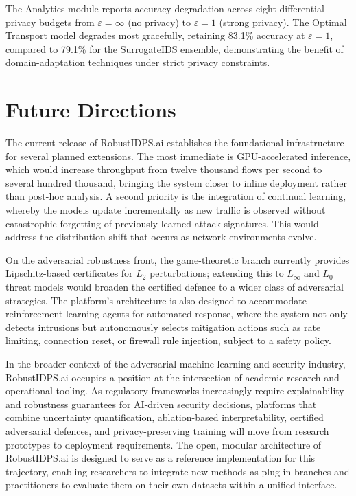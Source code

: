\documentclass[11pt,a4paper]{article}
\begin{document}
The Analytics module reports accuracy degradation across eight differential
privacy budgets from $\varepsilon = \infty$ (no privacy) to $\varepsilon = 1$
(strong privacy). The Optimal Transport model degrades most gracefully,
retaining 83.1\% accuracy at $\varepsilon = 1$, compared to 79.1\% for the
SurrogateIDS ensemble, demonstrating the benefit of domain-adaptation
techniques under strict privacy constraints.

\section{Future Directions}

The current release of RobustIDPS.ai establishes the foundational
infrastructure for several planned extensions. The most immediate is
GPU-accelerated inference, which would increase throughput from twelve
thousand flows per second to several hundred thousand, bringing the
system closer to inline deployment rather than post-hoc analysis. A
second priority is the integration of continual learning, whereby the
models update incrementally as new traffic is observed without
catastrophic forgetting of previously learned attack signatures. This
would address the distribution shift that occurs as network environments
evolve.

On the adversarial robustness front, the game-theoretic branch currently
provides Lipschitz-based certificates for $L_2$ perturbations; extending
this to $L_\infty$ and $L_0$ threat models would broaden the certified
defence to a wider class of adversarial strategies. The platform's
architecture is also designed to accommodate reinforcement learning agents
for automated response, where the system not only detects intrusions but
autonomously selects mitigation actions such as rate limiting, connection
reset, or firewall rule injection, subject to a safety policy.

In the broader context of the adversarial machine learning and security
industry, RobustIDPS.ai occupies a position at the intersection of
academic research and operational tooling. As regulatory frameworks
increasingly require explainability and robustness guarantees for
AI-driven security decisions, platforms that combine uncertainty
quantification, ablation-based interpretability, certified adversarial
defences, and privacy-preserving training will move from research
prototypes to deployment requirements. The open, modular architecture
of RobustIDPS.ai is designed to serve as a reference implementation for
this trajectory, enabling researchers to integrate new methods as
plug-in branches and practitioners to evaluate them on their own
datasets within a unified interface.
\end{document}
